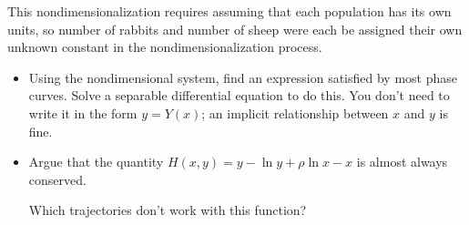 \documentclass[12pt]{amsart}
\theoremstyle{plain}
\theoremstyle{definition}
\theoremstyle{definition}
\theoremstyle{plain}
\begin{document}
    This nondimensionalization requires assuming that each population has its own units, so number
    of rabbits and number of sheep were each be assigned their own unknown constant in the
    nondimensionalization process.

    \begin{itemize}

        \item Using the nondimensional system, find an expression satisfied by most phase curves. Solve
        a separable differential equation to do this. You don't need to write it in the form $y=Y(x)$;
        an implicit relationship between $x$ and $y$ is fine.

        \item Argue that the quantity $H(x,y)=y-\ln y+\rho\ln x-x$ is almost always conserved.

        Which trajectories don't work with this function?

    \end{itemize}
\end{document}

